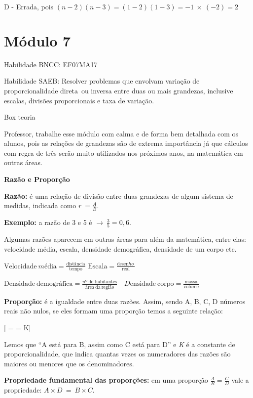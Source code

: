 D - Errada, pois
\(\left( n - 2 \right)\left( n - 3 \right) = \left( 1 - 2 \right)\left( 1 - 3 \right) = - 1\  \times \ ( - 2) = 2\)

\section{Módulo 7}

Habilidade BNCC: EF07MA17

Habilidade SAEB: Resolver problemas que envolvam variação de
proporcionalidade direta~ou inversa entre duas ou mais grandezas,
inclusive escalas, divisões proporcionais e taxa de variação.

Box teoria

Professor, trabalhe esse módulo com calma e de forma bem detalhada com
os alunos, pois as relações de grandezas são de extrema importância já
que cálculos com regra de três serão muito utilizados nos próximos anos,
na matemática em outras áreas.

\textbf{Razão e Proporção}

\textbf{{Razão:}} é uma relação de divisão entre duas grandezas de algum
sistema de medidas, indicada como \(r\  = \frac{A}{B}\).

\textbf{Exemplo:} a razão de 3 e 5 é
\(\rightarrow \ \frac{3}{5} = 0,6.\)

Algumas razões aparecem em outras áreas para além da matemática, entre
elas: velocidade média, escala, densidade demográfica, densidade de um
corpo etc.

\(\text{Vel}\text{ocidade}\ mé\text{dia} = \frac{\text{dist}â\text{ncia}}{\text{tempo}}\)
\(\text{Escala} = \frac{\text{desen}ho\ }{\text{real}}\ \)

\(\text{Densidade}\ \text{demogr}á\text{fica} = \frac{nº\ \text{de}\text{\ h}\text{abitantes}}{á\text{rea}\ \text{da}\ \text{regi}ão}\)
\(\text{\ \ \ \ \ \ \ \ \ \ \ \ \ \ \ \ \ \ \ \ \ \ \ \ \ }D\text{ensidade}\ \text{corpo} = \frac{\text{massa}}{\text{volume}}\)

\textbf{{Proporção:}} é a igualdade entre duas razões. Assim, sendo A,
B, C, D números reais não nulos, se eles formam uma proporção temos a
seguinte relação:

[ =  = K]

Lemos que ``A está para B, assim como C está para D'' e \emph{K} é a
constante de proporcionalidade, que indica quantas vezes os numeradores
das razões são maiores ou menores que os denominadores.

\textbf{{Propriedade fundamental das proporções:}} em uma proporção
\(\frac{A}{B} = \frac{C}{D}\) vale a propriedade:
\(A \times D\  = \ B \times C\).

